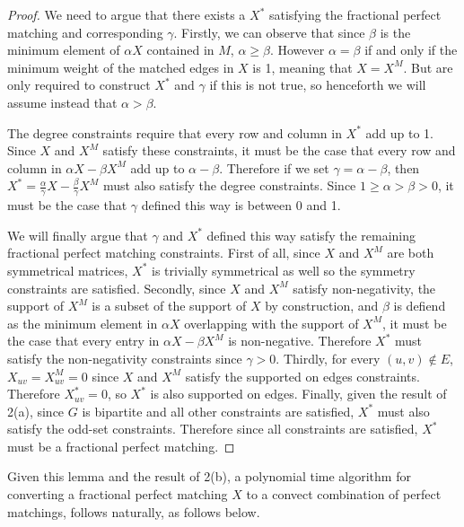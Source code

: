 \documentclass{hmcpset}
\begin{document}
\begin{solution}
\begin{enumerate}
\begin{proof}

  We need to argue that there exists a $X^*$ satisfying the fractional
  perfect matching and corresponding $\gamma$.
  Firstly, we can observe that since $\beta$ is the minimum element of
  $\alpha X$ contained in $M$, $\alpha \geq \beta$. However $\alpha = \beta$
  if and only if the minimum weight of the matched edges in $X$ is 1, meaning
  that $X = X^M$. But are only required to construct $X^*$ and $\gamma$ if
  this is not true, so henceforth we will assume instead that $\alpha > \beta$.

  The degree constraints require that every row and column in $X^*$ add up to
  1. Since $X$ and $X^M$ satisfy these constraints, it
  must be the case that every row and column in $\alpha X - \beta X^M$
  add up to $\alpha - \beta$. Therefore if we set $\gamma = \alpha - \beta$,
  then $X^* = \frac{\alpha}{\gamma} X - \frac{\beta}{\gamma} X^M$ must
  also satisfy the degree constraints. Since $1 \geq \alpha > \beta > 0$, it must
  be the case that $\gamma$ defined this way is between 0 and 1.
  
  We will finally argue that $\gamma$ and $X^*$ defined this way satisfy
  the remaining fractional perfect matching constraints. First of all, since
  $X$ and $X^M$ are both symmetrical matrices, $X^*$ is trivially symmetrical
  as well so the symmetry constraints are satisfied. Secondly, since $X$
  and $X^M$ satisfy non-negativity, the support of $X^M$ is a subset of
  the support of $X$ by construction, and $\beta$ is defiend as the minimum
  element in $\alpha X$ overlapping with the support of $X^M$, it must
  be the case that every entry in
  $\alpha X - \beta X^M$ is non-negative. Therefore $X^*$ must satisfy
  the non-negativity constraints since
  $\gamma > 0$. Thirdly, for every $(u, v) \notin E$, $X_{uv} = X^M_{uv} = 0$
  since $X$ and $X^M$ satisfy the supported on edges constraints.
  Therefore $X^*_{uv} = 0$, so $X^*$ is also supported on edges. Finally, given
  the result of 2(a), since $G$ is bipartite and all other constraints
  are satisfied, $X^*$ must also satisfy the odd-set constraints.
  Therefore since all constraints are satisfied, $X^*$ must be a fractional
  perfect matching.
\end{proof}

Given this lemma and the result of 2(b), a polynomial time algorithm for
converting a fractional perfect matching $X$ to a convect combination of perfect
matchings, follows naturally, as follows below.


\end{enumerate}
\end{solution}
\end{document}
